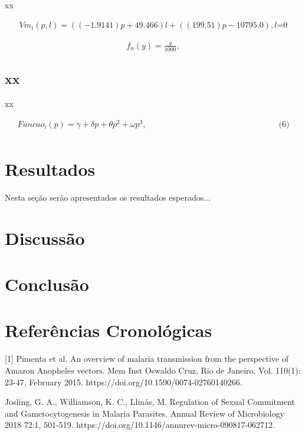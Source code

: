 \documentclass[12pt]{article}
\begin{document}
xx

\begin{align*}
Vm_{i}(p,l) = ((-1.9141)p + 49.466)l + ((199.51)p - 10795.0), \text {$l$=0} \tag{4}
\end{align*}

\begin{align*}
f_{n}(y) = \frac{y}{1000}, \tag{5}
\end{align*}

\subsection{xx}

xx

\begin{align*} 
Funcao_{i}(p) = \gamma + \delta p + \theta p^2 + \omega p^3, \qquad \qquad \qquad \qquad \qquad \qquad \qquad \qquad \text{(6)} \tag{6} \\
\end{align*} %

\newpage
\section{Resultados}

Nesta seção serão apresentados os resultados esperados...

\newpage
\section{Discussão}

\newpage
\section{Conclusão}


\newpage

\section{Referências Cronológicas}
[1] Pimenta et al. An overview of malaria transmission from the perspective of Amazon $\text{Anopheles vectors}$. Mem Inst Oswaldo Cruz, Rio de Janeiro, Vol. 110(1): 23-47, February 2015. https://doi.org/10.1590/0074-02760140266.  

\noindent [2] Josling, G. A., Williamson, K. C., Llinás, M. Regulation of Sexual Commitment and Gametocytogenesis in Malaria Parasites. Annual Review of Microbiology 2018 72:1, 501-519. https://doi.org/10.1146/annurev-micro-090817-062712. 
\end{document}
